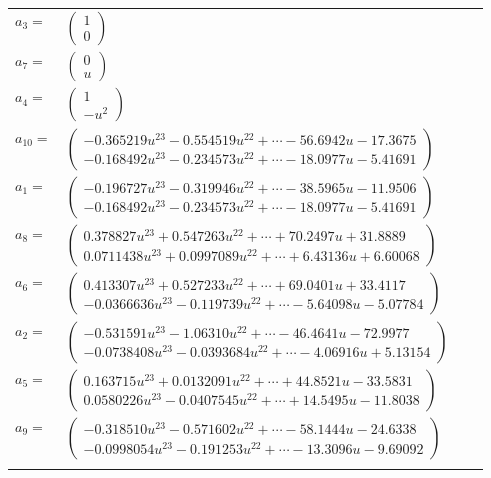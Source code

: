 \documentclass[1p]{elsarticle_modified}
\theoremstyle{definition}
\begin{document}
\begin{tabular}{m{7pt} m{180pt} m{7pt} m{180pt} }
\flushright $a_{3}=$&$\begin{pmatrix}1\\0\end{pmatrix}$ \\
\flushright $a_{7}=$&$\begin{pmatrix}0\\u\end{pmatrix}$ \\
\flushright $a_{4}=$&$\begin{pmatrix}1\\- u^2\end{pmatrix}$ \\
\flushright $a_{10}=$&$\begin{pmatrix}-0.365219 u^{23}-0.554519 u^{22}+\cdots-56.6942 u-17.3675\\-0.168492 u^{23}-0.234573 u^{22}+\cdots-18.0977 u-5.41691\end{pmatrix}$ \\
\flushright $a_{1}=$&$\begin{pmatrix}-0.196727 u^{23}-0.319946 u^{22}+\cdots-38.5965 u-11.9506\\-0.168492 u^{23}-0.234573 u^{22}+\cdots-18.0977 u-5.41691\end{pmatrix}$ \\
\flushright $a_{8}=$&$\begin{pmatrix}0.378827 u^{23}+0.547263 u^{22}+\cdots+70.2497 u+31.8889\\0.0711438 u^{23}+0.0997089 u^{22}+\cdots+6.43136 u+6.60068\end{pmatrix}$ \\
\flushright $a_{6}=$&$\begin{pmatrix}0.413307 u^{23}+0.527233 u^{22}+\cdots+69.0401 u+33.4117\\-0.0366636 u^{23}-0.119739 u^{22}+\cdots-5.64098 u-5.07784\end{pmatrix}$ \\
\flushright $a_{2}=$&$\begin{pmatrix}-0.531591 u^{23}-1.06310 u^{22}+\cdots-46.4641 u-72.9977\\-0.0738408 u^{23}-0.0393684 u^{22}+\cdots-4.06916 u+5.13154\end{pmatrix}$ \\
\flushright $a_{5}=$&$\begin{pmatrix}0.163715 u^{23}+0.0132091 u^{22}+\cdots+44.8521 u-33.5831\\0.0580226 u^{23}-0.0407545 u^{22}+\cdots+14.5495 u-11.8038\end{pmatrix}$ \\
\flushright $a_{9}=$&$\begin{pmatrix}-0.318510 u^{23}-0.571602 u^{22}+\cdots-58.1444 u-24.6338\\-0.0998054 u^{23}-0.191253 u^{22}+\cdots-13.3096 u-9.69092\end{pmatrix}$\\&\end{tabular}
\end{document}
